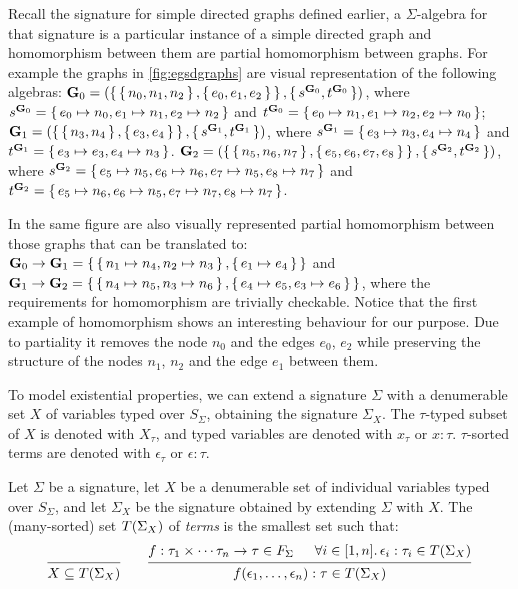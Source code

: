 Recall the signature for simple directed graphs defined earlier, a $\Sigma$-algebra for that signature is a particular
instance of a simple directed graph and homomorphism between them are partial homomorphism between graphs. For example
the graphs in \autoref{fig:egsdgraphs} are visual representation of the following algebras: $\mathbf{G}_0 =
(\set{\set{n_0, n_1, n_2},\set{e_0, e_1, e_2}}, \set{s^{\mathbf{G}_0}, t^{\mathbf{G}_0}})$, where $s^{\mathbf{G}_0} =
\set{e_0 \mapsto n_0, e_1 \mapsto n_1, e_2 \mapsto n_2}$ and $t^{\mathbf{G}_0} = \set{e_0 \mapsto n_1, e_1 \mapsto n_2,
e_2 \mapsto n_0}$; $\mathbf{G}_1 = (\set{\set{n_3,n_4},\set{e_3,e_4}},\set{s^{\mathbf{G}_1},t^{\mathbf{G}_1}})$,
where $s^{\mathbf{G}_1} = \set{e_3 \mapsto n_3, e_4 \mapsto n_4}$ and $t^{\mathbf{G}_1} = \set{e_3 \mapsto e_3, e_4
\mapsto n_3}$.  $\mathbf{G}_2 =
(\set{\set{n_5,n_6,n_7},\set{e_5,e_6,e_7,e_8}},\set{s^{\mathbf{G}_2},t^{\mathbf{G}_2}})$, where $s^{\mathbf{G}_2} =
\set{e_5 \mapsto n_5,e_6 \mapsto n_6,e_7\mapsto n_5, e_8 \mapsto n_7}$ and $t^{\mathbf{G}_2} = \set{e_5 \mapsto n_6,e_6
\mapsto n_5,e_7 \mapsto n_7, e_8 \mapsto n_7}$.

In the same figure are also visually represented partial homomorphism between those graphs that can be translated to:
$\mathbf{G}_0 \to \mathbf{G}_1 = \set{\set{n_1 \mapsto n_4,n_2 \mapsto n_3},\set{e_1 \mapsto e_4}}$ and $\mathbf{G}_1
\to \mathbf{G}_2 = \set{\set{n_4 \mapsto n_5, n_3 \mapsto n_6},\set{e_4 \mapsto e_5, e_3 \mapsto e_6}}$, where the
requirements for homomorphism are trivially checkable. Notice that the first example of homomorphism shows an interesting
behaviour for our purpose. Due to partiality it removes the node $n_0$ and the edges $e_0$, $e_2$ while preserving the
structure of the nodes $n_1$, $n_2$ and the edge $e_1$ between them.

To model existential properties, we can extend a signature $\Sigma$ with a denumerable set $X$ of variables typed over
$S_\Sigma$, obtaining the signature $\Sigma_X$. The $\tau$-typed subset of $X$ is denoted with $X_\tau$, and typed
variables are denoted with $x_\tau$ or $x : \tau$. $\tau$-sorted terms are denoted with $\epsilon_\tau$ or $\epsilon :
\tau$.

\begin{definition}[Term]
  Let $\Sigma$ be a signature, let $X$ be a denumerable set of individual variables typed over $S_\Sigma$, and let
  $\Sigma_X$ be the signature obtained by extending $\Sigma$ with $X$. The (many-sorted) set $T({\Sigma}_{X})$ of
  \emph{terms} is the smallest set such that:
  \[
    \begin{prooftree}
      \hypo{\phantom{[1,n]}} %
      \infer1{X \subseteq \terms{\Sigma}{X}}
    \end{prooftree}
    \qquad
    \begin{prooftree}
      \hypo{f : \tau_1 \times \cdots \tau_n \to \tau \in F_\Sigma}
      \hypo{\forall i \in [1,n] \ldotp \epsilon_i : \tau_i \in \terms{\Sigma}{X}}
      \infer2{f(\epsilon_1, \ldots, \epsilon_n) : \tau \in \terms{\Sigma}{X}}
    \end{prooftree}
  \]
\end{definition}

